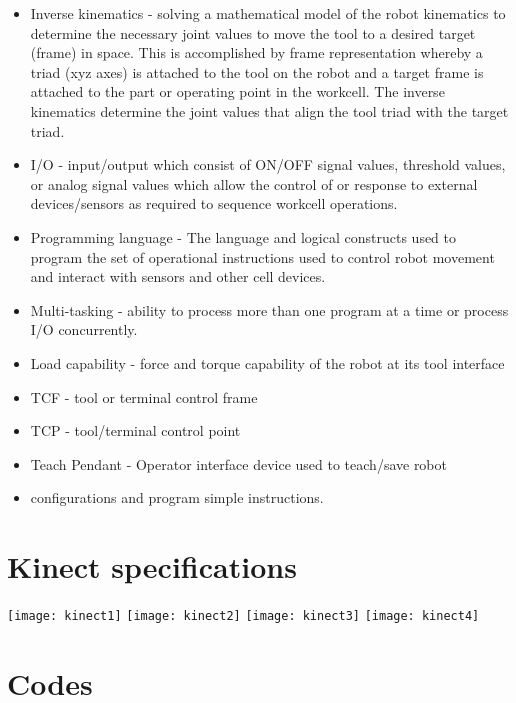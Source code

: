 \documentclass{book}
\begin{document}
\begin{itemize}
		\item Inverse kinematics - solving a mathematical model of the robot kinematics to determine the necessary joint values to move the tool to a desired target (frame) in space. This is accomplished by frame representation whereby a triad (xyz axes) is attached to the tool on the robot and a target frame is attached to the part or operating point in the workcell. The inverse kinematics determine the joint values that align the tool triad with the target triad.
		\item I/O - input/output which consist of ON/OFF signal values, threshold values, or analog signal values which allow the control of or response to external devices/sensors as required to sequence workcell operations.
		\item Programming language - The language and logical constructs used to program the set of operational instructions used to control robot movement and interact with sensors and other cell devices.
		\item Multi-tasking - ability to process more than one program at a time or process I/O concurrently.
		\item Load capability - force and torque capability of the robot at its tool interface
		\item TCF - tool or terminal control frame
		\item TCP - tool/terminal control point
		\item Teach Pendant - Operator interface device used to teach/save robot \item configurations and program simple instructions.
	\end{itemize}

\newpage
	\section{Kinect specifications}
		\begin{center}
		\texttt{[image: kinect1]}	
		\texttt{[image: kinect2]}
		\texttt{[image: kinect3]}
		\texttt{[image: kinect4]}
	\end{center}
	
	\newpage

		

		

	\newpage
	\section{Codes}
\end{document}
